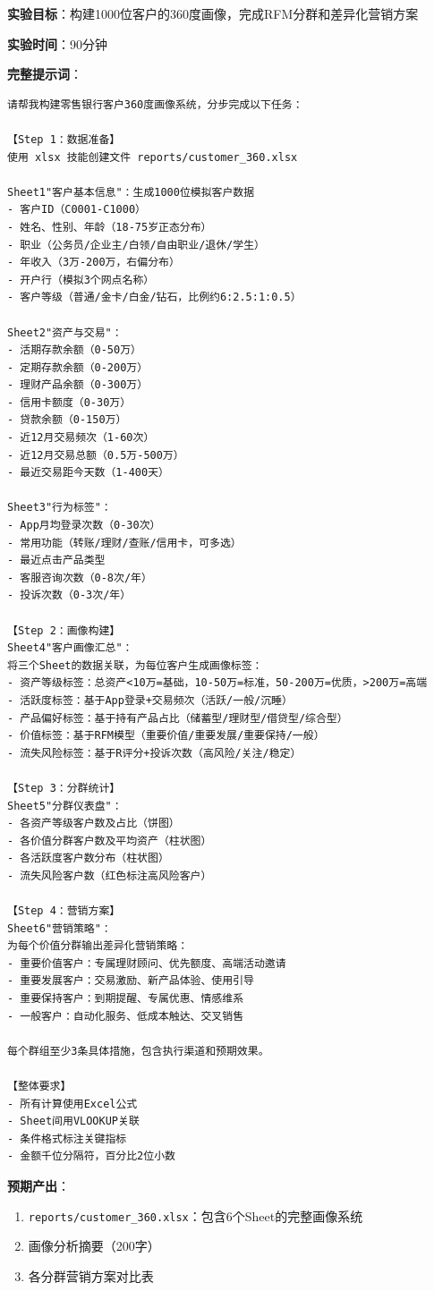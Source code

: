 \begin{exercisebox}

\textbf{实验目标}：构建1000位客户的360度画像，完成RFM分群和差异化营销方案

\textbf{实验时间}：90分钟

\textbf{完整提示词}：

\begin{lstlisting}
请帮我构建零售银行客户360度画像系统，分步完成以下任务：

【Step 1：数据准备】
使用 xlsx 技能创建文件 reports/customer_360.xlsx

Sheet1"客户基本信息"：生成1000位模拟客户数据
- 客户ID（C0001-C1000）
- 姓名、性别、年龄（18-75岁正态分布）
- 职业（公务员/企业主/白领/自由职业/退休/学生）
- 年收入（3万-200万，右偏分布）
- 开户行（模拟3个网点名称）
- 客户等级（普通/金卡/白金/钻石，比例约6:2.5:1:0.5）

Sheet2"资产与交易"：
- 活期存款余额（0-50万）
- 定期存款余额（0-200万）
- 理财产品余额（0-300万）
- 信用卡额度（0-30万）
- 贷款余额（0-150万）
- 近12月交易频次（1-60次）
- 近12月交易总额（0.5万-500万）
- 最近交易距今天数（1-400天）

Sheet3"行为标签"：
- App月均登录次数（0-30次）
- 常用功能（转账/理财/查账/信用卡，可多选）
- 最近点击产品类型
- 客服咨询次数（0-8次/年）
- 投诉次数（0-3次/年）

【Step 2：画像构建】
Sheet4"客户画像汇总"：
将三个Sheet的数据关联，为每位客户生成画像标签：
- 资产等级标签：总资产<10万=基础，10-50万=标准，50-200万=优质，>200万=高端
- 活跃度标签：基于App登录+交易频次（活跃/一般/沉睡）
- 产品偏好标签：基于持有产品占比（储蓄型/理财型/借贷型/综合型）
- 价值标签：基于RFM模型（重要价值/重要发展/重要保持/一般）
- 流失风险标签：基于R评分+投诉次数（高风险/关注/稳定）

【Step 3：分群统计】
Sheet5"分群仪表盘"：
- 各资产等级客户数及占比（饼图）
- 各价值分群客户数及平均资产（柱状图）
- 各活跃度客户数分布（柱状图）
- 流失风险客户数（红色标注高风险客户）

【Step 4：营销方案】
Sheet6"营销策略"：
为每个价值分群输出差异化营销策略：
- 重要价值客户：专属理财顾问、优先额度、高端活动邀请
- 重要发展客户：交易激励、新产品体验、使用引导
- 重要保持客户：到期提醒、专属优惠、情感维系
- 一般客户：自动化服务、低成本触达、交叉销售

每个群组至少3条具体措施，包含执行渠道和预期效果。

【整体要求】
- 所有计算使用Excel公式
- Sheet间用VLOOKUP关联
- 条件格式标注关键指标
- 金额千位分隔符，百分比2位小数
\end{lstlisting}

\textbf{预期产出}：
\begin{enumerate}[leftmargin=2em]
  \item \texttt{reports/customer\_360.xlsx}：包含6个Sheet的完整画像系统
  \item 画像分析摘要（200字）
  \item 各分群营销方案对比表
\end{enumerate}

\end{exercisebox}

